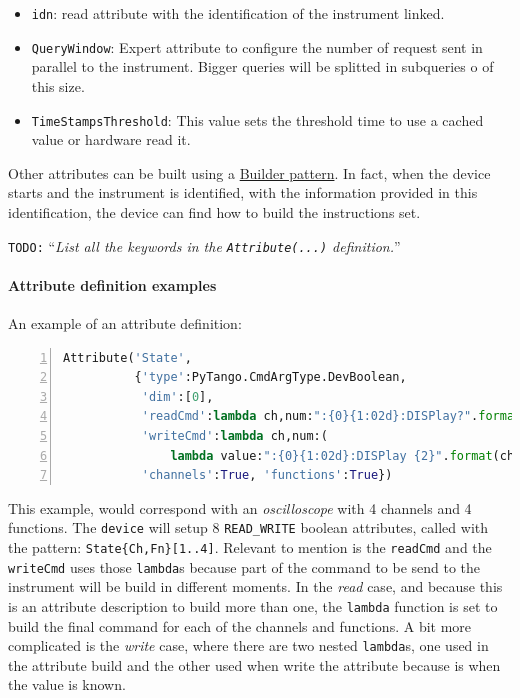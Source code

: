 \documentclass[a4paper,10pt]{article}
\newcommand{\todo}[1]{\texttt{\color{red}TODO:} ``\emph{#1}''}
\begin{document}
\begin{itemize}
    \item {\tt idn}: read attribute with the identification of the instrument linked.
    \item {\tt QueryWindow}: Expert attribute to configure the number of request sent in parallel to the instrument. Bigger queries will be splitted in subqueries o of this size.
    \item {\tt TimeStampsThreshold}: This value sets the threshold time to use a cached value or hardware read it.
\end{itemize}

Other attributes can be built using a \href{http://en.wikipedia.org/wiki/Builder_pattern}{Builder pattern}. In fact, when the device starts and the instrument is identified, with the information provided in this identification, the device can find how to build the instructions set.

\todo{List all the keywords in the \texttt{Attribute(...)} definition.}

\paragraph{Attribute definition examples}

An example of an attribute definition:

\begin{lstlisting}[language=python, basicstyle=\ttfamily\small\footnotesize, numbers=left]
Attribute('State',
          {'type':PyTango.CmdArgType.DevBoolean,
           'dim':[0],
           'readCmd':lambda ch,num:":{0}{1:02d}:DISPlay?".format(ch,num),
           'writeCmd':lambda ch,num:(
               lambda value:":{0}{1:02d}:DISPlay {2}".format(ch,num,value)),
           'channels':True, 'functions':True})
\end{lstlisting}

This example, would correspond with an \emph{oscilloscope} with 4 channels and 4 functions. The \texttt{device} will setup 8 {\tt READ\_WRITE} boolean attributes, called with the pattern: {\tt State\{Ch,Fn\}[1..4]}. Relevant to mention is the {\tt readCmd} and the {\tt writeCmd} uses those {\tt lambda}s because part of the command to be send to the instrument will be build in different moments. In the \emph{read} case, and because this is an attribute description to build more than one, the {\tt lambda} function is set to build the final command for each of the channels and functions. A bit more complicated is the \emph{write} case, where there are two nested {\tt lambda}s, one used in the attribute build and the other used when write the attribute because is when the value is known.
\end{document}
